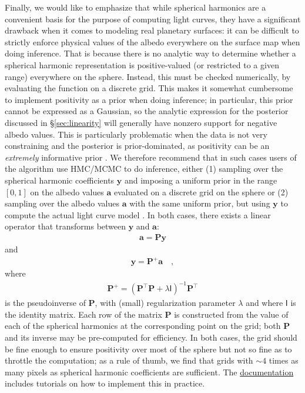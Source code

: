 \documentclass[modern]{aastex62}
\begin{document}
Finally, we would like to emphasize that while spherical harmonics are
a convenient basis for the purpose of computing light curves, they
have a significant drawback when it comes to modeling real planetary
surfaces: it can be difficult to strictly enforce physical
values of the albedo everywhere on the surface map when doing inference.
That is because there is no analytic way to determine whether a
spherical harmonic representation is positive-valued
(or restricted to a given range) everywhere on the sphere.
Instead, this must be checked numerically, by evaluating the function on a
discrete grid. This makes it somewhat cumbersome to implement positivity as a prior
when doing inference; in particular, this prior cannot be expressed as
a Gaussian, so the analytic expression for the posterior
discussed in \S\ref{sec:linearity} will generally have nonzero support for
negative albedo values. This is particularly problematic when the data is
not very constraining and the posterior is prior-dominated, as
positivity can be an \emph{extremely} informative prior
\citep[e.g.,][]{Fienup1978}.
We therefore recommend that in such cases
users of the \starry algorithm use HMC/MCMC to do inference, either
(1) sampling over the spherical
harmonic coefficients $\mathbf{y}$ and imposing a uniform prior in the range
$[0, 1]$ on the albedo values $\mathbf{a}$
evaluated on a discrete grid on the sphere or
(2) sampling over the albedo values $\mathbf{a}$ with the same uniform prior,
but using $\mathbf{y}$ to compute the actual light curve model
\citep{Bartolic2021}. In both
cases, there exists a linear operator that transforms between
$\mathbf{y}$ and $\mathbf{a}$:
%
\begin{align}
    \label{eq:Py}
    \mathbf{a} = \mathbf{P} \mathbf{y}
\end{align}
%
and
%
\begin{align}
    \label{eq:PInvy}
    \mathbf{y} = \mathbf{P}^+ \mathbf{a}
    \quad,
\end{align}
%
where
%
\begin{align}
    \label{eq:PInv}
    \mathbf{P}^+ =
    (\mathbf{P}^\top \mathbf{P} + \lambda \boldsymbol{\mathsf{I}})^{-1} \mathbf{P}^\top
\end{align}
%
is the pseudoinverse of $\mathbf{P}$, with (small) regularization parameter
$\lambda$ and where $\boldsymbol{\mathsf{I}}$ is the identity matrix.
%
Each row of the matrix $\mathbf{P}$ is constructed from the value
of each of the spherical harmonics at the corresponding point on the
grid; both $\mathbf{P}$ and its inverse may be pre-computed for
efficiency. In both cases, the grid should be fine enough to ensure
positivity over most of the sphere but not so fine as to throttle the
computation; as a rule of thumb, we find that grids with ${\sim}4$ times
as many pixels
as spherical harmonic coefficients are sufficient.
%
The \href{https://starry.readthedocs.io}{documentation}
includes tutorials on how to implement this in practice.
\end{document}
